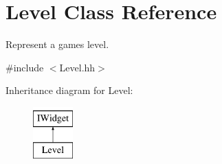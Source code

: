 \hypertarget{classLevel}{}\section{Level Class Reference}
\label{classLevel}


Represent a game\textquotesingle{}s level.  




{\ttfamily \#include $<$Level.\+hh$>$}

Inheritance diagram for Level\+:\begin{figure}[H]
\begin{center}
\leavevmode
\includegraphics[height=2.000000cm]{classLevel}
\end{center}
\end{figure}
